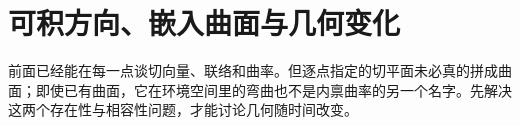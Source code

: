 \chapter{可积方向、嵌入曲面与几何变化}
\label{chap:math-geometric-structures}

前面已经能在每一点谈切向量、联络和曲率。但逐点指定的切平面未必真的拼成曲面；即使已有曲面，它在环境空间里的弯曲也不是内禀曲率的另一个名字。先解决这两个存在性与相容性问题，才能讨论几何随时间改变。




